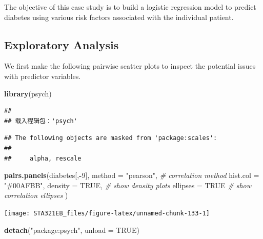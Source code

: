 \documentclass[
]{book}
\newenvironment{Shaded}{\begin{snugshade}}{\end{snugshade}}
\newcommand{\AttributeTok}[1]{\textcolor[rgb]{0.13,0.29,0.53}{#1}}
\newcommand{\CommentTok}[1]{\textcolor[rgb]{0.56,0.35,0.01}{\textit{#1}}}
\newcommand{\ConstantTok}[1]{\textcolor[rgb]{0.56,0.35,0.01}{#1}}
\newcommand{\DecValTok}[1]{\textcolor[rgb]{0.00,0.00,0.81}{#1}}
\newcommand{\FunctionTok}[1]{\textcolor[rgb]{0.13,0.29,0.53}{\textbf{#1}}}
\newcommand{\NormalTok}[1]{#1}
\newcommand{\SpecialCharTok}[1]{\textcolor[rgb]{0.81,0.36,0.00}{\textbf{#1}}}
\newcommand{\StringTok}[1]{\textcolor[rgb]{0.31,0.60,0.02}{#1}}
\begin{document}
The objective of this case study is to build a logistic regression model to predict diabetes using various risk factors associated with the individual patient.

\hypertarget{exploratory-analysis-1}{%
\subsection{Exploratory Analysis}\label{exploratory-analysis-1}}

We first make the following pairwise scatter plots to inspect the potential issues with predictor variables.

\begin{Shaded}
\begin{Highlighting}[]
\FunctionTok{library}\NormalTok{(psych)}
\end{Highlighting}
\end{Shaded}

\begin{verbatim}
## 
## 载入程辑包：'psych'
\end{verbatim}

\begin{verbatim}
## The following objects are masked from 'package:scales':
## 
##     alpha, rescale
\end{verbatim}

\begin{Shaded}
\begin{Highlighting}[]
\FunctionTok{pairs.panels}\NormalTok{(diabetes[,}\SpecialCharTok{{-}}\DecValTok{9}\NormalTok{], }
             \AttributeTok{method =} \StringTok{"pearson"}\NormalTok{, }\CommentTok{\# correlation method}
             \AttributeTok{hist.col =} \StringTok{"\#00AFBB"}\NormalTok{,}
             \AttributeTok{density =} \ConstantTok{TRUE}\NormalTok{,  }\CommentTok{\# show density plots}
             \AttributeTok{ellipses =} \ConstantTok{TRUE} \CommentTok{\# show correlation ellipses}
\NormalTok{             )}
\end{Highlighting}
\end{Shaded}

\begin{center}\texttt{[image: STA321EB\_files/figure-latex/unnamed-chunk-133-1]} \end{center}

\begin{Shaded}
\begin{Highlighting}[]
\FunctionTok{detach}\NormalTok{(}\StringTok{"package:psych"}\NormalTok{, }\AttributeTok{unload =} \ConstantTok{TRUE}\NormalTok{)}
\end{Highlighting}
\end{Shaded}
\end{document}
